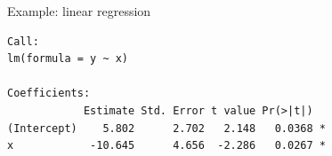 \begin{frame}[fragile]{Example: linear regression}
\footnotesize
\begin{verbatim}
Call:
lm(formula = y ~ x)

Coefficients:
            Estimate Std. Error t value Pr(>|t|)  
(Intercept)    5.802      2.702   2.148   0.0368 *
x            -10.645      4.656  -2.286   0.0267 *
\end{verbatim}
\pause
{}
\end{frame}

